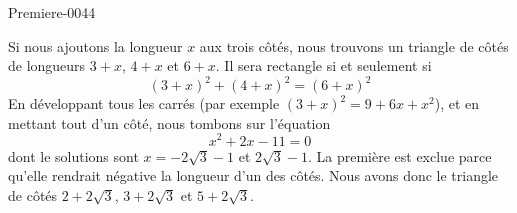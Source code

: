 
\begin{corrige}{Premiere-0044}

    Si nous ajoutons la longueur \( x\) aux trois côtés, nous trouvons un triangle de côtés de longueurs \( 3+x\), \( 4+x\) et \( 6+x\). Il sera rectangle si et seulement si
    \begin{equation}
        (3+x)^2+(4+x)^2=(6+x)^2
    \end{equation}
    En développant tous les carrés (par exemple \( (3+x)^2=9+6x+x^2\)), et en mettant tout d'un côté, nous tombons sur l'équation
    \begin{equation}
        x^2+2x-11=0
    \end{equation}
    dont le solutions sont \( x=-2\sqrt{3}-1\) et \( 2\sqrt{3}-1\). La première est exclue parce qu'elle rendrait négative la longueur d'un des côtés. Nous avons donc le triangle de côtés \( 2+2\sqrt{3}\), \( 3+2\sqrt{3}\) et \( 5+2\sqrt{3}\).

\end{corrige}
